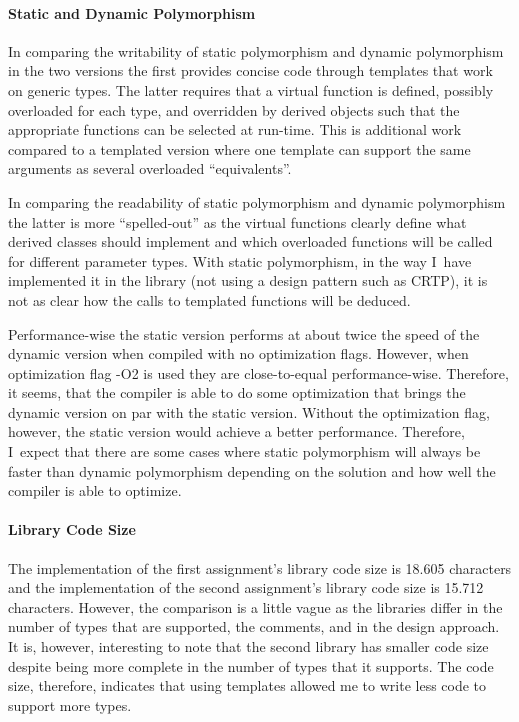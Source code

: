 \documentclass[a4paper]{report}
\begin{document}
\maketitle
\paragraph{Static and Dynamic Polymorphism}

In comparing the writability of static polymorphism and dynamic polymorphism  in the two versions the first provides concise code through templates that work on generic types. The latter requires that a virtual function is defined, possibly overloaded for each type, and overridden by derived objects such that the appropriate functions can be selected at run-time. This is additional work compared to a templated version where one template can support the same arguments as several overloaded ``equivalents''.

In comparing the readability of static polymorphism and dynamic polymorphism the latter is more ``spelled-out'' as the virtual functions clearly define what derived classes should implement and which overloaded functions will be called for different parameter types. With static polymorphism, in the way I~have implemented it in the library (not using a design pattern such as CRTP), it is not as clear how the calls to templated functions will be deduced.

Performance-wise the static version performs at about twice the speed of the dynamic version when compiled with no optimization flags. However, when optimization flag -O2 is used they are close-to-equal performance-wise. Therefore, it seems, that the compiler is able to do some optimization that brings the dynamic version on par with the static version. Without the optimization flag, however, the static version would achieve a better performance. Therefore, I~expect that there are some cases where static polymorphism will always be faster than dynamic polymorphism depending on the solution and how well the compiler is able to optimize.
\paragraph{Library Code Size}

The implementation of the first assignment's library code size is 18.605 characters and the implementation of the second assignment's library code size is 15.712 characters. However, the comparison is a little vague as the libraries differ in the number of types that are supported, the comments, and in the design approach. It is, however, interesting to note that the second library has smaller code size despite being more complete in the number of types that it supports. The code size, therefore, indicates that using templates allowed me to write less code to support more types.
\end{document}
